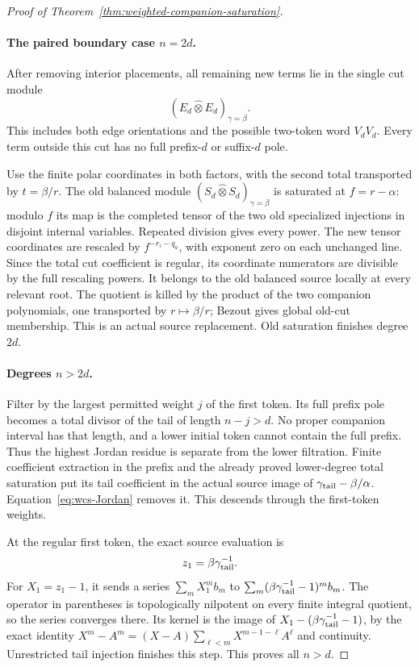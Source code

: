 \documentclass[11pt]{article}
\theoremstyle{definition}\newtheorem{definition}[theorem]{Definition}
\begin{document}
\begin{proof}[Proof of Theorem~\ref{thm:weighted-companion-saturation}]
\paragraph{The paired boundary case \(n=2d\).}
After removing interior placements, all remaining new
terms lie in the single cut module
\[
                  (E_d\widehat\otimes E_d)_{\gamma=\beta}.
\]
This includes both edge orientations and the possible
two-token word \(V_dV_d\).  Every term outside this cut
has no full prefix-\(d\) or suffix-\(d\) pole.

Use the finite polar coordinates in both factors, with
the second total transported by \(t=\beta/r\).
The old balanced module
\((S_d\widehat\otimes S_d)_{\gamma=\beta}\)
is saturated at \(f=r-\alpha\): modulo \(f\) its map is
the completed tensor of the two old specialized
injections in disjoint internal variables.  Repeated
division gives every power.
The new tensor coordinates are rescaled by
\(f^{-r_i-q_a}\), with exponent zero on each unchanged
line.  Since the total cut coefficient is regular,
its coordinate numerators are divisible by the full
rescaling powers.  It belongs to the old balanced
source locally at every relevant root.  The quotient
is killed by the product of the two companion
polynomials, one transported by \(r\mapsto\beta/r\);
Bezout gives global old-cut membership.  This is an
actual source replacement.  Old saturation finishes
degree \(2d\).

\paragraph{Degrees \(n>2d\).}
Filter by the largest permitted weight \(j\) of the
first token.  Its full prefix pole becomes a total
divisor of the tail of length \(n-j>d\).  No proper
companion interval has that length, and a lower
initial token cannot contain the full prefix.
Thus the highest Jordan residue is separate from the
lower filtration.  Finite coefficient extraction in
the prefix and the already proved lower-degree total
saturation put its tail coefficient in the actual
source image of \(\gamma_{\rm tail}-\beta/\alpha\).
Equation~\eqref{eq:wcs-Jordan} removes it.  This descends
through the first-token weights.

At the regular first token, the exact source evaluation is
\[
 z_1=\beta\gamma_{\rm tail}^{-1}.
\]
For \(X_1=z_1-1\), it sends a series
\(\sum_m X_1^m b_m\) to
\(\sum_m(\beta\gamma_{\rm tail}^{-1}-1)^m b_m\).
The operator in parentheses is topologically nilpotent
on every finite integral quotient, so the series
converges there.  Its kernel is the image of
\(X_1-(\beta\gamma_{\rm tail}^{-1}-1)\), by the exact
identity \(X^m-A^m=(X-A)\sum_{\ell<m}X^{m-1-\ell}A^\ell\)
and continuity.  Unrestricted tail injection finishes
this step.  This proves all \(n>d\).


\end{proof}
\end{document}
